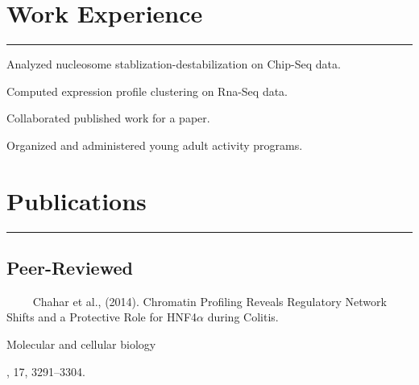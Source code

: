 \documentclass[letterpaper]{deedy-resume} %
\newcommand{\colorrule}[1]{%
\begingroup\color{#1}\hrule\endgroup%
}%
\begin{document}
\section{Work Experience}
\normalfont
\colorrule{black}
\vspace{2 mm}
\hfill
{}
\hfill
{}
\vspace{1 mm}
\begin{tightitemize}
	\item Analyzed nucleosome stablization-destabilization  on Chip-Seq data. 
	\item Computed expression profile clustering on Rna-Seq data. 	
	\item Collaborated published work for a paper.
\end{tightitemize}
\sectionspace %
\vspace{2 mm}
\hfill
{}
\hfill
{}
\vspace{1 mm}
\begin{tightitemize}
	\item Organized and administered young adult activity programs.
\end{tightitemize}
\sectionspace

\section{Publications}
\normalfont
\colorrule{black}
\vspace{2 mm}
\subsection{Peer-Reviewed}
\quad \ \ \textbullet{} \ \ Chahar et al., (2014). Chromatin Profiling Reveals Regulatory Network Shifts and a Protective Role for HNF4$\alpha$ during Colitis. \begin{em}Molecular and cellular biology\end{em}, 17, 3291–3304.
%
%
\end{document}

